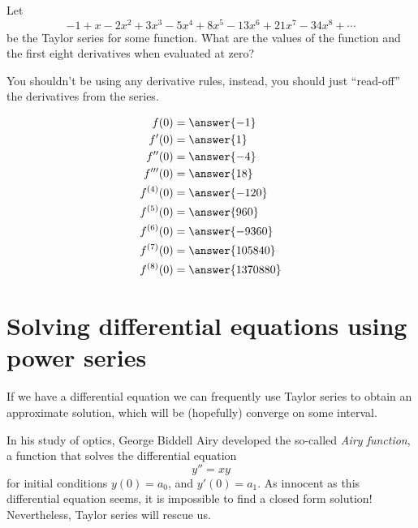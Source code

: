 \documentclass{ximera}
\begin{document}
\begin{question}
  Let
  \[
  -1 + x - 2x^2 + 3x^3 - 5x^4 + 8x^5-13x^6+21x^7 -34x^8 + \cdots  
  \]
  be the Taylor series for some function. What are the values of the
  function and the first eight derivatives when evaluated at zero?
  \begin{hint}
    You shouldn't be using any derivative rules, instead, you should
    just ``read-off'' the derivatives from the series.
  \end{hint}
  \begin{prompt}
    \begin{align*}
      f(0) &= \answer{-1}\\
      f'(0) &= \answer{1}\\
      f''(0) &= \answer{-4}\\
      f'''(0) &= \answer{18}\\
      f^{(4)}(0) &= \answer{-120}\\
      f^{(5)}(0) &= \answer{960}\\
      f^{(6)}(0) &= \answer{-9360}\\
      f^{(7)}(0) &= \answer{105840}\\
      f^{(8)}(0) &= \answer{1370880}
    \end{align*}
  \end{prompt}
\end{question}




\section{Solving differential equations using power series}

If we have a differential equation we can frequently use Taylor series
to obtain an approximate solution, which will be (hopefully) converge
on some interval.

In his study of optics, George Biddell Airy developed the so-called
\textit{Airy function}, a function that solves the differential
equation
\[
y'' = xy
\]
for initial conditions $y(0) = a_0$, and $y'(0) = a_1$.  As innocent as
this differential equation seems, it is impossible to find a closed
form solution! Nevertheless, Taylor series will rescue us.
\end{document}

